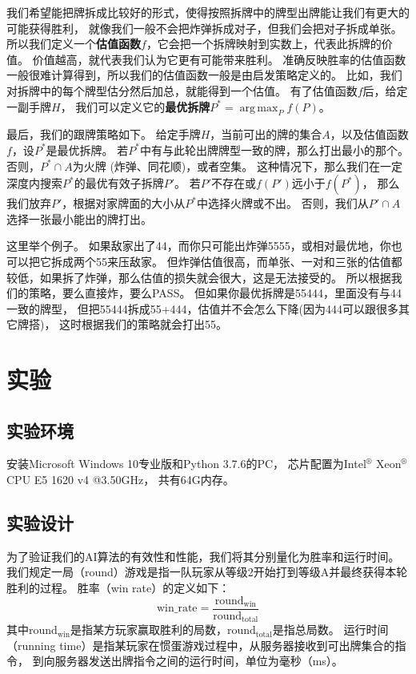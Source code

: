 \documentclass[a4paper]{ctexart}
\DeclareMathOperator*{\argmax}{arg\,max}
\begin{document}
\begin{enumerate}
\begin{enumerate}
    我们希望能把牌拆成比较好的形式，使得按照拆牌中的牌型出牌能让我们有更大的可能获得胜利，
    就像我们一般不会把炸弹拆成对子，但我们会把对子拆成单张。
    所以我们定义一个\textbf{估值函数}$f$，它会把一个拆牌映射到实数上，代表此拆牌的价值。
    价值越高，就代表我们认为它更有可能带来胜利。
    准确反映胜率的估值函数一般很难计算得到，所以我们的估值函数一般是由启发策略定义的。
    比如，我们对拆牌中的每个牌型估分然后加总，就能得到一个估值。
    有了估值函数$f$后，给定一副手牌$H$，
    我们可以定义它的\textbf{最优拆牌}$P^*=\argmax_{P} f(P)$。
    
    最后，我们的跟牌策略如下。
    给定手牌$H$，当前可出的牌的集合$A$，以及估值函数$f$，设$P^*$是最优拆牌。
    若$P^*$中有与此轮出牌牌型一致的牌，那么打出最小的那个。
    否则，$P^*\cap A$为火牌 (炸弹、同花顺)，或者空集。
    这种情况下，那么我们在一定深度内搜索$P^*$的最优有效子拆牌$P'$。
    若$P'$不存在或$f(P')$远小于$f(P^*)$，
    那么我们放弃$P'$，根据对家牌面的大小从$P^*$中选择火牌或不出。
    否则，我们从$P'\cap A$选择一张最小能出的牌打出。
    
    这里举个例子。
    如果敌家出了44，而你只可能出炸弹5555，或相对最优地，你也可以把它拆成两个55来压敌家。
    但炸弹估值很高，而单张、一对和三张的估值都较低，如果拆了炸弹，那么估值的损失就会很大，这是无法接受的。
    所以根据我们的策略，要么直接炸，要么PASS。
    但如果你最优拆牌是55444，里面没有与44一致的牌型，
    但把55444拆成55+444，估值并不会怎么下降(因为444可以跟很多其它牌搭)，
    这时根据我们的策略就会打出55。
    
  \end{enumerate}
\end{enumerate}

\section{实验} \label{sec:experiment}

\subsection{实验环境}

安装Microsoft Windows 10专业版和Python 3.7.6的PC，
芯片配置为Intel$^\circledR$ Xeon$^\circledR$  CPU E5 1620 v4 @3.50GHz，
共有64G内存。

\subsection{实验设计}

为了验证我们的AI算法的有效性和性能，我们将其分别量化为胜率和运行时间。
我们规定一局（round）游戏是指一队玩家从等级2开始打到等级A并最终获得本轮胜利的过程。
胜率（win rate）的定义如下：
\[\mathrm{win\_rate} = \frac{\mathrm{round}_{\mathrm{win}}}{\mathrm{round}_{\mathrm{total}}}\]
其中$\mathrm{round}_{\mathrm{win}}$是指某方玩家赢取胜利的局数，$\mathrm{round}_{\mathrm{total}}$是指总局数。
运行时间（running time）是指某玩家在惯蛋游戏过程中，从服务器接收到可出牌集合的指令，
到向服务器发送出牌指令之间的运行时间，单位为毫秒（ms）。
\end{document}
